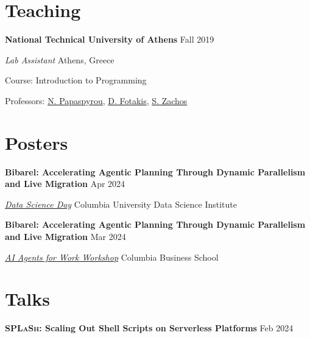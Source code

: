 \documentclass[margin,12pt]{resume}
\newcommand{\subsectionVSpace}{\vspace{3.5ex}\xspace}
\newcommand{\sectionVSpace}{\vspace{1ex}\xspace} %
\newcommand{\pash}{\textsc{PaSh}\xspace}
\newcommand{\sectionVSpaceCorrection}{\vspace{-3.5ex}} %
\newcommand{\splash}{\textsc{SPLaSh}\xspace}
\newcommand{\header}[1]{\textbf{#1}\xspace}
\newcommand{\event}[1]{\textit{#1}\xspace}
\newcommand{\institution}[1]{\header{#1}\xspace}
\newcommand{\place}[1]{#1\xspace}
\newcommand{\poster}[1]{\header{#1}\xspace}
\newcommand{\role}[1]{\textit{#1}\xspace}
\newcommand{\singleDate}[1]{#1\xspace}
\newcommand{\stitle}[1]{#1:\xspace}
\newcommand{\talk}[1]{\header{#1}\xspace}
\newenvironment{rSubsection}{}{\par\subsectionVSpace}
\newenvironment{rSection}[1]{\sectionVSpaceCorrection\section{#1}\xspace}{\sectionVSpace\par}
\begin{document}
\begin{resume}
\begin{rSection}{Teaching}
        \begin{rSubsection}
            \institution{National Technical University of Athens} \hfill \singleDate{Fall 2019}

            \role{Lab Assistant} \hfill \place{Athens, Greece}

            \stitle{Course} Introduction to Programming

            \stitle{Professors} \href{http://www.softlab.ntua.gr/~nickie/}{N. Papaspyrou}, \href{http://www.softlab.ntua.gr/~fotakis/}{D. Fotakis}, \href{https://en.wikipedia.org/wiki/Stathis_Zachos}{S. Zachos}
        \end{rSubsection}
    \end{rSection}

    \begin{rSection}{Posters}
        \begin{rSubsection}
            \poster{Bibarel: Accelerating Agentic Planning Through Dynamic Parallelism and Live Migration} \hfill Apr 2024

            \event{\href{https://datascience.columbia.edu/event/data-science-day-2025/}{Data Science Day}} \hfill \place{Columbia University Data Science Institute}
        \end{rSubsection}

        \begin{rSubsection}
            \poster{Bibarel: Accelerating Agentic Planning Through Dynamic Parallelism and Live Migration} \hfill Mar 2024

            \event{\href{https://daplab.cs.columbia.edu/workshop/}{AI Agents for Work Workshop}} \hfill \place{Columbia Business School}
        \end{rSubsection}
    \end{rSection}

    \begin{rSection}{Talks}


        \begin{rSubsection}
            \talk{\splash: Scaling Out Shell Scripts on Serverless Platforms} \hfill \singleDate{Feb 2024}


\end{rSubsection}
\end{rSection}
\end{resume}
\end{document}
